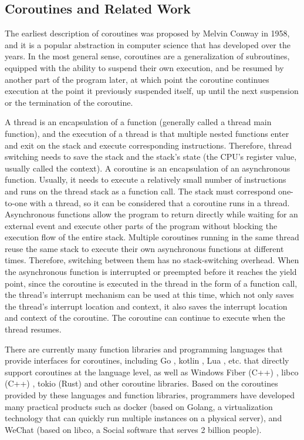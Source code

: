 \documentclass[10pt]{article}
\begin{document}
\subsection{Coroutines and Related Work}

The earliest description of coroutines was proposed by Melvin Conway \cite{conway1963design} in 1958, and it is a popular abstraction in computer science that has developed over the years. In the most general sense, coroutines \cite{waern2021coroutines, moura2009revisiting} are a generalization of subroutines, equipped with the ability to suspend their own execution, and be resumed by another part of the program later, at which point the coroutine continues execution at the point it previously suspended itself, up until the next suspension or the termination of the coroutine.

A thread is an encapsulation of a function (generally called a thread main function), and the execution of a thread is that multiple nested functions enter and exit on the stack and execute corresponding instructions. Therefore, thread switching needs to save the stack and the stack's state (the CPU's register value, usually called the context). A coroutine is an encapsulation of an asynchronous function. Usually, it needs to execute a relatively small number of instructions and runs on the thread stack as a function call. The stack must correspond one-to-one with a thread, so it can be considered that a coroutine runs in a thread. Asynchronous functions allow the program to return directly while waiting for an external event and execute other parts of the program without blocking the execution flow of the entire stack. Multiple coroutines running in the same thread reuse the same stack to execute their own asynchronous functions at different times. Therefore, switching between them has no stack-switching overhead. When the asynchronous function is interrupted or preempted before it reaches the yield point, since the coroutine is executed in the thread in the form of a function call, the thread's interrupt mechanism can be used at this time, which not only saves the thread's interrupt location and context, it also saves the interrupt location and context of the coroutine. The coroutine can continue to execute when the thread resumes.

There are currently many function libraries and programming languages that provide interfaces for coroutines, including Go \cite{prabhakar2011concurrent}, kotlin \cite{elizarov2021kotlin}, Lua \cite{de2004coroutines}, etc. that directly support coroutines at the language level, as well as Windows Fiber (C++) \cite{Fibers}, libco (C++) \cite{Boost}, tokio (Rust) \cite{weber2020process} and other coroutine libraries. Based on the coroutines provided by these languages and function libraries, programmers have developed many practical products such as docker (based on Golang, a virtualization technology that can quickly run multiple instances on a physical server), and WeChat (based on libco, a Social software that serves 2 billion people).
\end{document}
